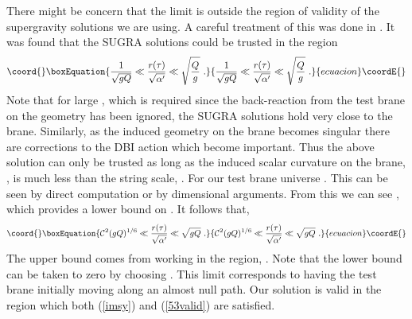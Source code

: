 \documentclass[a4paper,12pt]{article}
\providecommand{\ap}{\alpha^{\prime}}
\begin{document}
There might be concern that the limit \coordHE{} is
outside the region of validity of the supergravity solutions we are
using. A careful treatment of this was done in \cite{imsy}.  It was
found that the SUGRA solutions could be trusted in the region
\begin{equation}\coord{}\boxEquation{
\frac{1}{\sqrt{g Q}}  \ll \frac{r(\tau)}{\sqrt{\ap}} \ll
\sqrt{\frac{Q}{g}} \ .
\label{imsy}
}{
\frac{1}{\sqrt{g Q}}  \ll \frac{r(\tau)}{\sqrt{\ap}} \ll
\sqrt{\frac{Q}{g}} \ .
}{ecuacion}\coordE{}\end{equation}
Note that for large \coordHE{}, which is required since the
back-reaction from the test brane on the geometry has been ignored,
the SUGRA solutions hold very close to the brane.
Similarly, as the induced geometry on the brane becomes singular there
are corrections to the DBI action which become important.  Thus the
above solution can only be trusted as long as
the induced scalar curvature on the brane, \coordHE{}, is much less than
the string scale,  
\coordHE{}.  For our test brane universe 
\coordHE{}.
This can be seen by direct computation or by dimensional
arguments.  From this we can see \coordHE{}, 
which provides a lower bound on \coordHE{}.  It follows that,
\begin{equation}\coord{}\boxEquation{
\mathcal{C}^2 (g Q)^{1/6} 
\ll \frac{r(\tau)}{\sqrt{\ap}} \ll \sqrt{g Q} \ .
\label{53valid}
}{
\mathcal{C}^2 (g Q)^{1/6} 
\ll \frac{r(\tau)}{\sqrt{\ap}} \ll \sqrt{g Q} \ .
}{ecuacion}\coordE{}\end{equation}
The upper bound comes from working in the region, \coordHE{}.
Note that the lower bound can be taken to zero by choosing
\coordHE{}.  This limit corresponds to having the test brane
initially moving along an almost null path.
Our solution is valid in the region which both (\ref{imsy}) and (\ref{53valid})
are satisfied.
\end{document}
